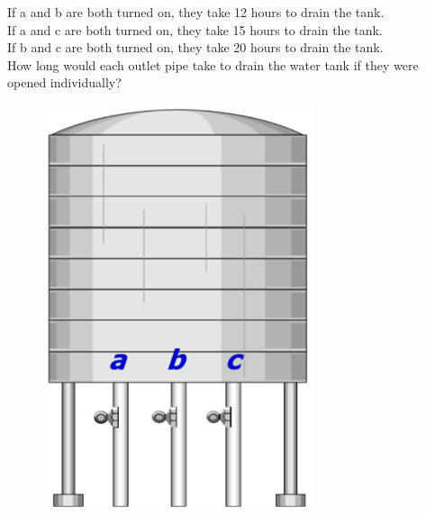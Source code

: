 \documentclass[../main.tex]{subfiles}
\begin{document}
\begin{enumerate}
    If a and b are both turned on, they take 12 hours to drain the tank.\\
    If a and c are both turned on, they take 15 hours to drain the tank.\\
    If b and c are both turned on, they take 20 hours to drain the tank.\\
    
    How long would each outlet pipe take to drain the water tank if they were opened individually?
    \begin{figure}[H]
        \centering
        \includegraphics{images/t1w10q4.png}
    \end{figure}
\end{enumerate}
\end{document}
